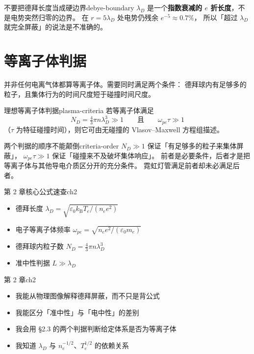 \documentclass[11pt,a4paper,openany,oneside]{book}
\newcommand{\eps}{\varepsilon}
\newcommand{\difficulty}[1]{%
  \marginnote{\raggedleft
    \tikz[baseline=(m.base)]{%
      \node[fill=diffMark!12, draw=diffMark!55, line width=0.4pt,
            rounded corners=4pt, inner xsep=4pt, inner ysep=1.6pt,
            text=diffMark, font=\scriptsize\heiti] (m) {#1};}%
    \hspace{1.2mm}}%
}
\begin{document}
\begin{warning}{不要把德拜长度当成硬边界}{debye-boundary}
$\lambda_D$ 是一个\textbf{指数衰减的 $e$ 折长度}，不是电势突然归零的边界。
在 $r=5\lambda_D$ 处电势仍残余 $e^{-5}\approx0.7\%$，
所以「超过 $\lambda_D$ 就完全屏蔽」的说法是不准确的。
\end{warning}

\clearpage

\section{等离子体判据}

\difficulty{基础}

\noindent 并非任何电离气体都算等离子体。需要同时满足两个条件：
德拜球内有足够多的粒子，且集体行为的时间尺度短于碰撞时间尺度。

\begin{theorem}{理想等离子体判据}{plasma-criteria}
若等离子体满足
\begin{equation}
  N_D = \tfrac{4}{3}\pi n\lambda_D^3 \gg 1
  \qquad\text{且}\qquad
  \omega_{pe}\tau \gg 1
  \label{eq:preview-criteria}
\end{equation}
（$\tau$ 为特征碰撞时间），则它可由无碰撞的 Vlasov--Maxwell 方程组描述。
\end{theorem}

\begin{insight}{两个判据的顺序不能颠倒}{criteria-order}
$N_D\gg1$ 保证「有足够多的粒子来集体屏蔽」，
$\omega_{pe}\tau\gg1$ 保证「碰撞来不及破坏集体响应」。
前者是必要条件，后者才是把等离子体与其他导电介质区分开的充分条件。
霓虹灯管满足前者却未必满足后者。
\end{insight}

\begin{formulabox}{第 2 章核心公式速查}{ch2}
\begin{itemize}
  \item 德拜长度 $\lambda_D=\sqrt{\eps_0 k_\mathrm{B}T_e/(n_e e^2)}$
  \item 电子等离子体频率 $\omega_{pe}=\sqrt{n_e e^2/(\eps_0 m_e)}$
  \item 德拜球内粒子数 $N_D=\tfrac43\pi n\lambda_D^3$
  \item 准中性判据 $L\gg\lambda_D$
\end{itemize}
\end{formulabox}

\begin{checklistbox}{第 2 章}{ch2}
\begin{itemize}
  \item 我能从物理图像解释德拜屏蔽，而不只是背公式
  \item 我能区分「准中性」与「电中性」的差别
  \item 我会用 §2.3 的两个判据判断给定体系是否为等离子体
  \item 我知道 $\lambda_D$ 与 $n_e^{-1/2}$、$T_e^{1/2}$ 的依赖关系
\end{itemize}
\end{checklistbox}
\end{document}
